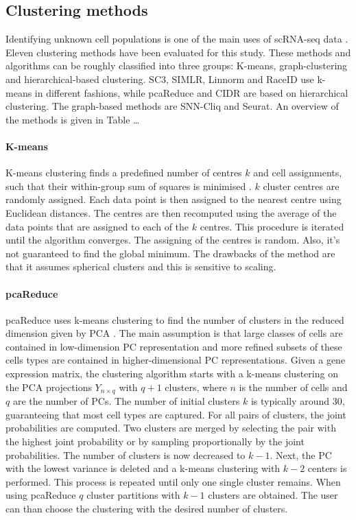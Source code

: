 \documentclass[12pt, a4paper]{article}\usepackage[]{graphicx}\usepackage[]{color}
\begin{document}
\subsection{Clustering methods}
Identifying unknown cell populations is one of the main uses of scRNA-seq data \citep{andrews2017identifying}. Eleven clustering methods have been evaluated for this study. These methods and algorithms can be roughly classified into three groups: K-means, graph-clustering and hierarchical-based clustering. 
SC3, SIMLR, Linnorm and RaceID use k-means in different fashions, while pcaReduce and CIDR are based on hierarchical clustering. The graph-based methods are SNN-Cliq and Seurat. An overview of the methods is given in Table \dots
\paragraph{K-means}
K-means clustering finds a predefined number of centres $k$ and cell assignments, such that their within-group sum of squares is minimised \citep{hartigan1979algorithm}. $k$ cluster centres are randomly assigned.
Each data point is then assigned to the nearest centre using Euclidean distances. The centres are then recomputed using the average of the data points that are assigned to each of the $k$ centres. This procedure is iterated until the algorithm converges. The assigning of the centres is random. Also, it's not guaranteed to find the global minimum.  The drawbacks of the method are that it assumes spherical clusters and this is sensitive to scaling. 
\paragraph{pcaReduce}
pcaReduce uses k-means clustering to find the number of clusters in the reduced dimension given by PCA \citep{yau2016pcareduce}. The main assumption is that large classes of cells are contained in low-dimension PC representation and more refined subsets of these cells types are contained in higher-dimensional PC representations. Given a gene expression matrix, the clustering algorithm starts with a k-means clustering on the PCA projections $Y_{n\times q}$ with $q+1$ clusters, where $n$ is the number of cells and $q$ are the number of PCs. The number of initial clusters $k$ is typically around 30,  guaranteeing that most cell types are captured. For all pairs of clusters, the joint probabilities are computed. Two clusters are merged by selecting the pair with the highest joint probability or by sampling proportionally by the joint probabilities. The number of clusters is now decreased to $k-1$. Next, the PC with the lowest variance is deleted and a k-means clustering with $k-2$ centers is performed. This process is repeated until only one single cluster remains. When using pcaReduce $q$ cluster partitions with $k-1$ clusters are obtained. The user can than choose the clustering with the desired number of clusters.
\end{document}
